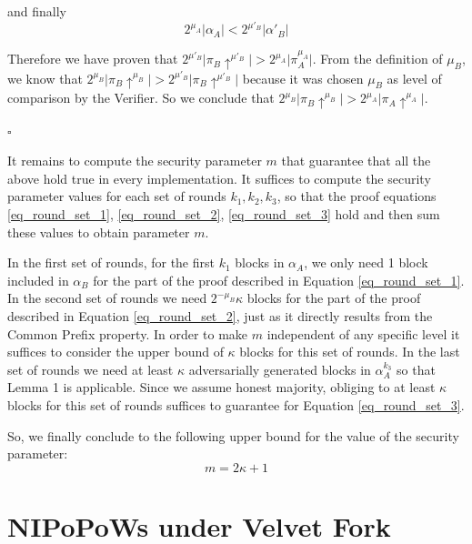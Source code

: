 \documentclass[11pt,a4paper]{article}
\begin{document}
and finally 
\begin{equation}
2^{\mu_A} \vert \alpha_A \vert < 2^{\mu'_B} \vert \alpha'{_B} \vert
\end{equation}


Therefore we have proven that $2^{\mu'_B} \vert \pi_B \uparrow^{\mu'_B} \vert > 2^{\mu_A} \vert \pi_A^{\mu_A} \vert$. From the definition of $\mu_B$, we know that $2^{\mu_B} \vert \pi_B \uparrow^{\mu_B} \vert > 2^{\mu'_B} \vert \pi_B \uparrow^{\mu'_B} \vert$ because it was chosen $\mu_B$ as level of comparison by the Verifier. So we conclude that $2^{\mu_B} \vert \pi_B \uparrow^{\mu_B} \vert > 2^{\mu_A} \vert \pi_A \uparrow^{\mu_A} \vert$.

\begin{flushright}
$\square$
\end{flushright}

It remains to compute the security parameter $m$ that guarantee that all the above hold true in every implementation. It suffices to compute the security parameter values for each set of rounds $k_1, k_2, k_3$, so that the proof equations \ref{eq_round_set_1}, \ref{eq_round_set_2}, \ref{eq_round_set_3} hold and then sum these values to obtain parameter $m$.

In the first set of rounds, for the first $k_1$ blocks in $\alpha_A$, we only need 1 block included in $\alpha_B$ for the part of the proof described in Equation \ref{eq_round_set_1}. In the second set of rounds we need $2^{-\mu_B}\kappa$ blocks for the part of the proof described in Equation \ref{eq_round_set_2}, just as it directly results from the Common Prefix property. In order to make $m$ independent of any specific level it suffices to consider the upper bound of $\kappa$ blocks for this set of rounds. In the last set of rounds we need at least $\kappa$ adversarially generated blocks in $\alpha_A^{k_3}$ so that Lemma 1 is applicable. Since we assume honest majority, obliging to at least $\kappa$ blocks for this set of rounds suffices to guarantee for Equation \ref{eq_round_set_3}.

So, we finally conclude to the following upper bound for the value of the
 security parameter:
\begin{equation}
m = 2\kappa + 1 
\end{equation}
 
\section{NIPoPoWs under Velvet Fork}
\end{document}
